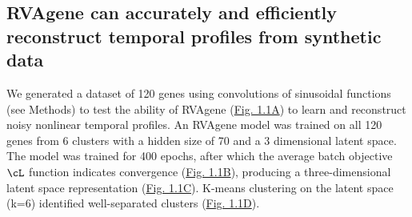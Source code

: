 
\subsection{RVAgene can accurately and efficiently reconstruct temporal profiles from synthetic data}
We generated a dataset of 120 genes using convolutions of sinusoidal functions (see Methods) to test
the ability of RVAgene (\hyperref[fig:fig2]{Fig. 1.1A}) to learn and reconstruct noisy nonlinear
temporal profiles. An RVAgene model was trained on all 120 genes from 6 clusters with a hidden size
of 70 and a 3 dimensional latent space. The model was trained for 400 epochs, after which the
average batch objective $\cL$ function indicates convergence (\hyperref[fig:fig2]{Fig. 1.1B}),
producing a three-dimensional latent space representation (\hyperref[fig:fig2]{Fig. 1.1C}). K-means
clustering on the latent space (k=6) identified well-separated clusters (\hyperref[fig:fig2]{Fig. 1.1D}).


